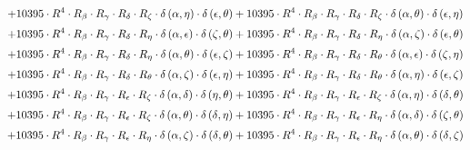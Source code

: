 \begin{subequations}
\begin{gather}
 \\[0.2em] \notag 		 + 10395 \cdot R^{4} \cdot R_{\beta{}} \cdot R_{\gamma{}} \cdot R_{\delta{}} \cdot R_{\zeta{}} \cdot \delta{}\left(\alpha{}, \eta{}\right) \cdot \delta{}\left(\epsilon{}, \theta{}\right)+ 10395 \cdot R^{4} \cdot R_{\beta{}} \cdot R_{\gamma{}} \cdot R_{\delta{}} \cdot R_{\zeta{}} \cdot \delta{}\left(\alpha{}, \theta{}\right) \cdot \delta{}\left(\epsilon{}, \eta{}\right) 
 \\[0.2em] \notag 		 + 10395 \cdot R^{4} \cdot R_{\beta{}} \cdot R_{\gamma{}} \cdot R_{\delta{}} \cdot R_{\eta{}} \cdot \delta{}\left(\alpha{}, \epsilon{}\right) \cdot \delta{}\left(\zeta{}, \theta{}\right)+ 10395 \cdot R^{4} \cdot R_{\beta{}} \cdot R_{\gamma{}} \cdot R_{\delta{}} \cdot R_{\eta{}} \cdot \delta{}\left(\alpha{}, \zeta{}\right) \cdot \delta{}\left(\epsilon{}, \theta{}\right) 
 \\[0.2em] \notag 		 + 10395 \cdot R^{4} \cdot R_{\beta{}} \cdot R_{\gamma{}} \cdot R_{\delta{}} \cdot R_{\eta{}} \cdot \delta{}\left(\alpha{}, \theta{}\right) \cdot \delta{}\left(\epsilon{}, \zeta{}\right)+ 10395 \cdot R^{4} \cdot R_{\beta{}} \cdot R_{\gamma{}} \cdot R_{\delta{}} \cdot R_{\theta{}} \cdot \delta{}\left(\alpha{}, \epsilon{}\right) \cdot \delta{}\left(\zeta{}, \eta{}\right) 
 \\[0.2em] \notag 		 + 10395 \cdot R^{4} \cdot R_{\beta{}} \cdot R_{\gamma{}} \cdot R_{\delta{}} \cdot R_{\theta{}} \cdot \delta{}\left(\alpha{}, \zeta{}\right) \cdot \delta{}\left(\epsilon{}, \eta{}\right)+ 10395 \cdot R^{4} \cdot R_{\beta{}} \cdot R_{\gamma{}} \cdot R_{\delta{}} \cdot R_{\theta{}} \cdot \delta{}\left(\alpha{}, \eta{}\right) \cdot \delta{}\left(\epsilon{}, \zeta{}\right) 
 \\[0.2em] \notag 		 + 10395 \cdot R^{4} \cdot R_{\beta{}} \cdot R_{\gamma{}} \cdot R_{\epsilon{}} \cdot R_{\zeta{}} \cdot \delta{}\left(\alpha{}, \delta{}\right) \cdot \delta{}\left(\eta{}, \theta{}\right)+ 10395 \cdot R^{4} \cdot R_{\beta{}} \cdot R_{\gamma{}} \cdot R_{\epsilon{}} \cdot R_{\zeta{}} \cdot \delta{}\left(\alpha{}, \eta{}\right) \cdot \delta{}\left(\delta{}, \theta{}\right) 
 \\[0.2em] \notag 		 + 10395 \cdot R^{4} \cdot R_{\beta{}} \cdot R_{\gamma{}} \cdot R_{\epsilon{}} \cdot R_{\zeta{}} \cdot \delta{}\left(\alpha{}, \theta{}\right) \cdot \delta{}\left(\delta{}, \eta{}\right)+ 10395 \cdot R^{4} \cdot R_{\beta{}} \cdot R_{\gamma{}} \cdot R_{\epsilon{}} \cdot R_{\eta{}} \cdot \delta{}\left(\alpha{}, \delta{}\right) \cdot \delta{}\left(\zeta{}, \theta{}\right) 
 \\[0.2em] \notag 		 + 10395 \cdot R^{4} \cdot R_{\beta{}} \cdot R_{\gamma{}} \cdot R_{\epsilon{}} \cdot R_{\eta{}} \cdot \delta{}\left(\alpha{}, \zeta{}\right) \cdot \delta{}\left(\delta{}, \theta{}\right)+ 10395 \cdot R^{4} \cdot R_{\beta{}} \cdot R_{\gamma{}} \cdot R_{\epsilon{}} \cdot R_{\eta{}} \cdot \delta{}\left(\alpha{}, \theta{}\right) \cdot \delta{}\left(\delta{}, \zeta{}\right) 

\end{gather}
\end{subequations}
